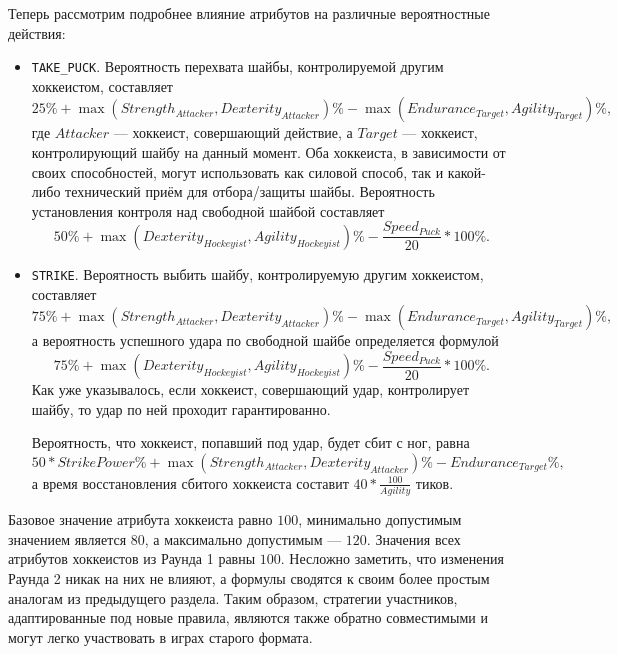 Теперь рассмотрим подробнее влияние атрибутов на различные вероятностные действия:
\begin{itemize}
  \item \texttt{TAKE\_PUCK}. Вероятность перехвата шайбы, контролируемой другим хоккеистом, составляет
        \begin{equation}
        25\%+\max{(Strength_{Attacker}, Dexterity_{Attacker})}\%-\max{(Endurance_{Target}, Agility_{Target})}\%,
        \end{equation}
        где $Attacker$ --- хоккеист, совершающий действие, а $Target$ --- хоккеист, контролирующий шайбу на данный момент. Оба хоккеиста, в
        зависимости от своих способностей, могут использовать как силовой способ, так и какой-либо технический приём для отбора/защиты
        шайбы. Вероятность установления контроля над свободной шайбой составляет
        \begin{equation}
        50\%+\max{(Dexterity_{Hockeyist}, Agility_{Hockeyist})}\%-\frac{Speed_{Puck}}{20}*100\%.
        \end{equation}
  \item \texttt{STRIKE}. Вероятность выбить шайбу, контролируемую другим хоккеистом, составляет
        \begin{equation}
        75\%+\max{(Strength_{Attacker}, Dexterity_{Attacker})}\%-\max{(Endurance_{Target}, Agility_{Target})}\%,
        \end{equation}
        а вероятность успешного удара по свободной шайбе определяется формулой
        \begin{equation}
        75\%+\max{(Dexterity_{Hockeyist}, Agility_{Hockeyist})}\%-\frac{Speed_{Puck}}{20}*100\%.
        \end{equation}
        Как уже указывалось, если хоккеист, совершающий удар, контролирует шайбу, то удар по ней проходит гарантированно.

        Вероятность, что хоккеист, попавший под удар, будет сбит с ног, равна
        \begin{equation}
        50*StrikePower\%+\max{(Strength_{Attacker}, Dexterity_{Attacker})}\%-Endurance_{Target}\%,
        \end{equation}
        а время восстановления сбитого хоккеиста составит $40*\frac{100}{Agility}$ тиков.
\end{itemize}

Базовое значение атрибута хоккеиста равно $100$, минимально допустимым значением является $80$, а максимально допустимым --- $120$. Значения
всех атрибутов хоккеистов из Раунда 1 равны $100$. Несложно заметить, что изменения Раунда 2 никак на них не влияют, а формулы сводятся к
своим более простым аналогам из предыдущего раздела. Таким образом, стратегии участников, адаптированные под новые правила, являются также
обратно совместимыми и могут легко участвовать в играх старого формата.

